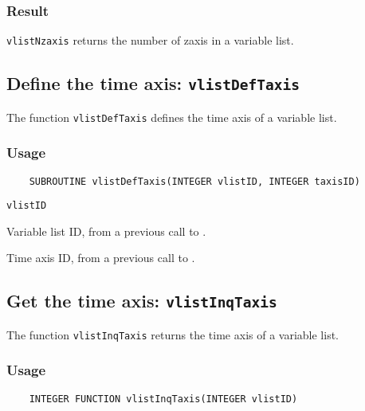 \subsubsection*{Result}

{\tt vlistNzaxis} returns the number of zaxis in a variable list.



\subsection{Define the time axis: {\tt vlistDefTaxis}}
\label{vlistDefTaxis}

The function {\tt vlistDefTaxis} defines the time axis of a variable list.

\subsubsection*{Usage}

\begin{verbatim}
    SUBROUTINE vlistDefTaxis(INTEGER vlistID, INTEGER taxisID)
\end{verbatim}

\hspace*{4mm}\begin{minipage}[]{15cm}
\begin{deflist}{\tt vlistID\ }
\item[{\tt vlistID}]
Variable list ID, from a previous call to {}.
\item[{\tt taxisID}]
Time axis ID, from a previous call to {}.

\end{deflist}
\end{minipage}


\subsection{Get the time axis: {\tt vlistInqTaxis}}
\label{vlistInqTaxis}

The function {\tt vlistInqTaxis} returns the time axis of a variable list.

\subsubsection*{Usage}

\begin{verbatim}
    INTEGER FUNCTION vlistInqTaxis(INTEGER vlistID)
\end{verbatim}

